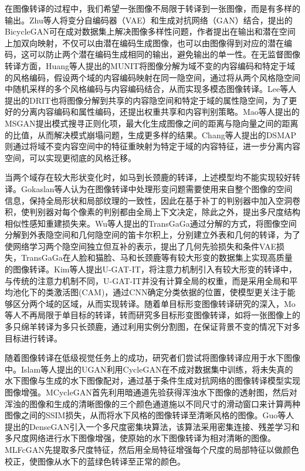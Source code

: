 在图像转译的过程中，我们希望一张图像不局限于转译到一张图像，而是有多样的输出。Zhu等人将变分自编码器（VAE\cite{kingma2013auto}）和生成对抗网络（GAN\cite{goodfellow2014generative}）结合，提出的BicycleGAN\cite{zhu2017toward}可在成对数据集上解决图像多样性问题，作者提出在输出和潜在空间上加双向映射，不仅可以由潜在编码生成图像，也可以由图像得到对应的潜在编码，这可以防止两个潜在编码生成相同的输出，避免输出的单一性。在无监督图像转译方面，Huang等人提出的MUNIT\cite{huang2018multimodal}将图像分解为域不变的内容编码和特定于域的风格编码，假设两个域的内容编码映射在同一隐空间，通过将从两个风格隐空间中随机采样的多个风格编码与内容编码结合，从而实现多模态图像转译。Lee等人提出的DRIT\cite{lee2018diverse}也将图像分解到共享的内容隐空间和特定于域的属性隐空间，为了更好的分离内容编码和属性编码，还提出权重共享和内容判别策略。Mao等人提出的
MSGAN\cite{mao2019mode}提出模式搜寻正则化项，最大化生成图像之间的距离与隐向量之间的距离的比值，从而解决模式崩塌问题，生成更多样的结果。Chang等人提出的DSMAP\cite{chang2020domain}则通过将域不变内容空间中的特征重映射为特定于域的内容特征，进一步分离内容空间，可以实现更彻底的风格迁移。

当两个域存在较大形状变化时，如马到长颈鹿的转译，上述模型均不能实现较好转译。Gokaslan等人\cite{gokaslan2018improving}认为在图像转译中处理形变问题需要使用来自整个图像的空间信息，保持全局形状和局部纹理的一致性，因此在基于补丁的判别器中加入空洞卷积，使判别器对每个像素的判别都由全局上下文决定，除此之外，提出多尺度结构相似性感知重建损失来。Wu等人提出的TransGaGa\cite{wu2019transgaga}通过分解的方式，将图像空间分解到外表隐空间和几何隐空间的笛卡尔积上，分别建立外表和几何的转译，为了使网络学习两个隐空间独立但互补的表示，提出了几何先验损失和条件VAE损失，TransGaGa在人脸和猫脸、马和长颈鹿等有较大形变的数据集上实现高质量的图像转译。Kim等人提出U-GAT-IT\cite{kim2019u}，将注意力机制引入有较大形变的转译中，与传统的注意力机制不同，U-GAT-IT并没有计算全局的权重，而是采用全局和平均池化下的类激活图(CAM)，通过CNN确定分类依据的位置，使模型更关注于能够区分两个域的区域，从而实现转译。随着单目标形变图像转译研究的深入，Mo等人\cite{mo2018instagan}不再局限于单目标的转译，转而研究多目标形变图像转译，如将一张图像上的多只绵羊转译为多只长颈鹿，通过利用实例分割图，在保证背景不变的情况下对多目标进行转译。

随着图像转译在低级视觉任务上的成功，研究者们尝试将图像转译应用于水下图像中。Islam等人提出的UGAN\cite{fabbri2018enhancing}利用CycleGAN在不成对数据集中训练，将未失真的水下图像与生成的水下图像配对，通过基于条件生成对抗网络的图像转译模型实现图像增强。MCycleGAN\cite{lu2019multi}首先利用暗通道先验获得浑浊水下图像的透射图，然后对浑浊的图像和生成的清晰图像的三个颜色通道施以不同尺寸的滑动窗口来计算两种图像之间的SSIM\cite{wang2004image}损失，从而将水下风格的图像转译至清晰风格的图像。Guo等人提出的DenseGAN\cite{guo2019underwater}引入一个多尺度密集块算法，该算法采用密集连接、残差学习和多尺度网络进行水下图像增强，使原始的水下图像转译为相对清晰的图像。MLFcGAN\cite{liu2019mlfcgan}先提取多尺度特征，然后用全局特征增强每个尺度的局部特征以做颜色校正，使图像从水下的蓝绿色转译至正常的颜色。

